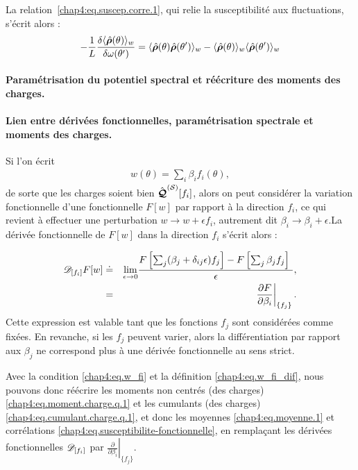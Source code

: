 La relation~\eqref{chap4:eq.suscep.corre.1}, qui relie la susceptibilité aux fluctuations, s’écrit alors :
\begin{equation}
-\frac{1}{L} \frac{\delta \langle \hat{\bm{\rho}}(\theta) \rangle_w}{\delta \omega(\theta')} = \langle \hat{\bm{\rho}}(\theta) \hat{\bm{\rho}}(\theta') \rangle_w - \langle \hat{\bm{\rho}}(\theta) \rangle_w \langle \hat{\bm{\rho}}(\theta') \rangle_w 
\end{equation}



\paragraph{Paramétrisation du potentiel spectral et réécriture des moments des charges.}
\paragraph{Lien entre dérivées fonctionnelles, paramétrisation spectrale et moments des charges.}

Si l'on écrit
\begin{eqnarray}\label{chap4:eq.w_fi}
	w(\theta) = \sum_i \beta_i f_i(\theta),	
\end{eqnarray}
de sorte que les charges soient bien $\hat{\bm{\mathcal{Q}}}^{(\mathcal{S})}[f_i] $, alors on peut considérer la variation fonctionnelle d'une fonctionnelle $F[w]$ par rapport à la direction $f_i$, ce qui revient à effectuer une perturbation $w \rightarrow w + \epsilon f_i$, autrement dit $\beta_i \rightarrow \beta_i + \epsilon$.La dérivée fonctionnelle de $F[w]$ dans la direction $f_i$ s’écrit alors :

\begin{eqnarray}\label{chap4:eq.w_fi_dif}
	\dfonc{f_i} F[w]  &\doteq &  \underset{\epsilon \to 0 }{ \lim  } \frac{ F\left[\sum_j ( \beta_j + \delta_{ij} \epsilon) f_j \right]  - F \left[\sum_j  \beta_j f_j\right] }{\epsilon},\\
	& = & \left. \frac{ \partial F}{ \partial \beta_i } \right|_{\{f_j\}}.	
\end{eqnarray}
Cette expression est valable tant que les fonctions $f_j$ sont considérées comme fixées. En revanche, si les $f_j$ peuvent varier, alors la différentiation par rapport aux $\beta_j$ ne correspond plus à une dérivée fonctionnelle au sens strict.

Avec la condition \eqref{chap4:eq.w_fi} et la définition \eqref{chap4:eq.w_fi_dif}, nous pouvons donc réécrire les moments non centrés (des charges) \eqref{chap4:eq.moment.charge.q.1} et les cumulants (des charges) \eqref{chap4:eq.cumulant.charge.q.1}, et donc les moyennes \eqref{chap4:eq.moyenne.1} et corrélations \eqref{chap4:eq.susceptibilite-fonctionnelle}, en remplaçant les dérivées fonctionnelles $\mathscr{D}_{[f_i]}$ par $\left. \frac{ \partial}{ \partial \beta_i } \right|_{\{f_j\}}$.

